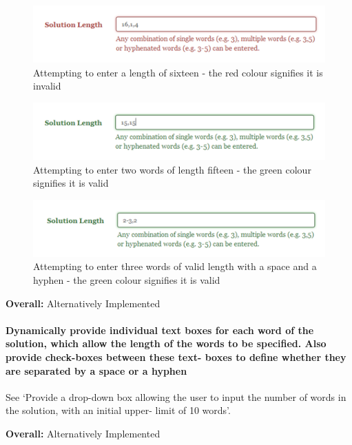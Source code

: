 \begin{figure}[H]
	\centering
	\includegraphics[keepaspectratio=true]{evidence/dropdown1.png}
	\caption{Attempting to enter a length of sixteen - the red colour signifies it
	is invalid}
\end{figure}

\begin{figure}[H]
	\centering
	\includegraphics[keepaspectratio=true]{evidence/dropdown2.png}
	\caption{Attempting to enter two words of length fifteen - the green colour 
	signifies it is valid}
\end{figure}

\begin{figure}[H]
	\centering
	\includegraphics[keepaspectratio=true]{evidence/dropdown3.png}
	\caption{Attempting to enter three words of valid length with a space and a 
	hyphen - the green colour signifies it is valid}
\end{figure}

{\bf Overall:} Alternatively Implemented


\paragraph{Dynamically provide individual text boxes for each word of the
solution, which allow the length of the words to be specified. Also provide
check-boxes between these text- boxes to define whether they are separated by a
space or a hyphen}

See `Provide a drop-down box allowing the user to input the number of words in
the solution, with an initial upper- limit of 10 words'.

{\bf Overall:} Alternatively Implemented


